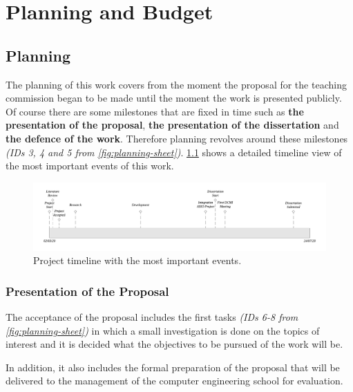\chapter{Planning and Budget}
\label{ch:planning-and-budget}

\section{Planning}
The planning of this work covers from the moment the proposal for the teaching commission began
to be made until the moment the work is presented publicly. Of course there are some milestones
that are fixed in time such as \textbf{the presentation of the proposal}, \textbf{the presentation of the dissertation}
and \textbf{the defence of the work}. Therefore planning revolves around these milestones \textit{(IDs
3, 4 and 5 from \cref{fig:planning-sheet})}. \cref{fig:timeline} shows a detailed timeline view of the most
important events of this work.

\begin{figure}
    \includegraphics[width=\textwidth]{images/timeline.pdf}
    \centering
	\caption[Project timeline]{Project timeline with the most important events.}
    \label{fig:timeline}
\end{figure}

\subsection{Presentation of the Proposal}
The acceptance of the proposal includes the first tasks \textit{(IDs
6-8 from \cref{fig:planning-sheet})} in which a small investigation is done on the
topics of interest and it is decided what the objectives to be pursued of the work will be.

In addition, it also includes the formal preparation of the proposal that will be delivered to the
management of the computer engineering school for evaluation.

